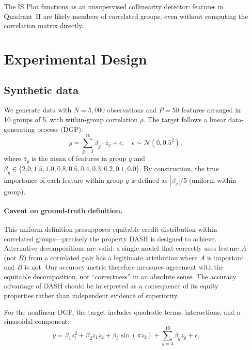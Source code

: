 \documentclass[11pt]{article}
\newcommand{\dash}{\textsc{DASH}}
\newcommand{\rhovar}{\rho}
\begin{document}
The IS Plot functions as an unsupervised collinearity detector: features
in Quadrant~II are likely members of correlated groups, even without
computing the correlation matrix directly.


\section{Experimental Design}
\label{sec:experiments}

\subsection{Synthetic data}

We generate data with $N = 5{,}000$ observations and $P = 50$ features
arranged in 10 groups of 5, with within-group correlation $\rhovar$.
The target follows a linear data-generating process (DGP):
\begin{equation}
  y = \sum_{g=1}^{10} \beta_g \cdot \bar{z}_g + \epsilon,
  \quad \epsilon \sim \mathcal{N}(0, 0.5^2),
\end{equation}
where $\bar{z}_g$ is the mean of features in group $g$ and
$\beta_g \in \{2.0, 1.5, 1.0, 0.8, 0.6, 0.4, 0.3, 0.2, 0.1, 0.0\}$.
By construction, the true importance of each feature within group $g$ is
defined as $|\beta_g|/5$ (uniform within group).

\paragraph{Caveat on ground-truth definition.}
This uniform definition presupposes equitable credit distribution
within correlated groups---precisely the property \dash{} is designed
to achieve. Alternative decompositions are valid: a single model that
correctly uses feature $A$ (not $B$) from a correlated pair has a
legitimate attribution where $A$ is important and $B$ is not. Our
accuracy metric therefore measures agreement with the equitable
decomposition, not ``correctness'' in an absolute sense. The accuracy
advantage of \dash{} should be interpreted as a consequence of its
equity properties rather than independent evidence of superiority.

For the nonlinear DGP, the target includes quadratic terms, interactions,
and a sinusoidal component:
\begin{equation}
  y = \beta_1 z_1^2 + \beta_2 z_1 z_2 + \beta_3 \sin(\pi z_3) +
  \sum_{g=4}^{10} \beta_g z_g + \epsilon.
\end{equation}
\end{document}
